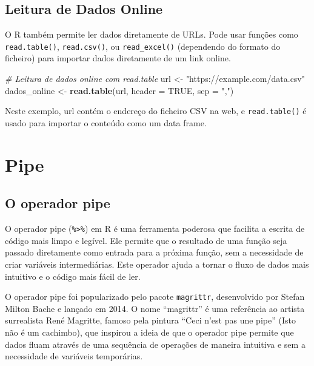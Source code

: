 \documentclass[
]{book}
\newenvironment{Shaded}{\begin{snugshade}}{\end{snugshade}}
\newcommand{\AttributeTok}[1]{\textcolor[rgb]{0.13,0.29,0.53}{#1}}
\newcommand{\CommentTok}[1]{\textcolor[rgb]{0.56,0.35,0.01}{\textit{#1}}}
\newcommand{\ConstantTok}[1]{\textcolor[rgb]{0.56,0.35,0.01}{#1}}
\newcommand{\FunctionTok}[1]{\textcolor[rgb]{0.13,0.29,0.53}{\textbf{#1}}}
\newcommand{\NormalTok}[1]{#1}
\newcommand{\OtherTok}[1]{\textcolor[rgb]{0.56,0.35,0.01}{#1}}
\newcommand{\StringTok}[1]{\textcolor[rgb]{0.31,0.60,0.02}{#1}}
\begin{document}
\section{Leitura de Dados Online}\label{leitura-de-dados-online}

O R também permite ler dados diretamente de URLs. Pode usar funções como
\texttt{read.table()}, \texttt{read.csv()}, ou \texttt{read\_excel()} (dependendo do formato
do ficheiro) para importar dados diretamente de um link online.

\begin{Shaded}
\begin{Highlighting}[]
\CommentTok{\# Leitura de dados online com read.table}
\NormalTok{url }\OtherTok{\textless{}{-}} \StringTok{"https://example.com/data.csv"}
\NormalTok{dados\_online }\OtherTok{\textless{}{-}} \FunctionTok{read.table}\NormalTok{(url, }\AttributeTok{header =} \ConstantTok{TRUE}\NormalTok{, }\AttributeTok{sep =} \StringTok{","}\NormalTok{)}
\end{Highlighting}
\end{Shaded}

Neste exemplo, url contém o endereço do ficheiro CSV na web, e
\texttt{read.table()} é usado para importar o conteúdo como um data frame.

\chapter{Pipe}\label{pipe}

\section{O operador pipe}\label{o-operador-pipe}

O operador pipe (\texttt{\%\textgreater{}\%}) em R é uma ferramenta poderosa que facilita a
escrita de código mais limpo e legível. Ele permite que o resultado de
uma função seja passado diretamente como entrada para a próxima função,
sem a necessidade de criar variáveis intermediárias. Este operador ajuda
a tornar o fluxo de dados mais intuitivo e o código mais fácil de ler.

O operador pipe foi popularizado pelo pacote \texttt{magrittr}, desenvolvido
por Stefan Milton Bache e lançado em 2014. O nome ``magrittr'' é uma
referência ao artista surrealista René Magritte, famoso pela pintura
``Ceci n'est pas une pipe'' (Isto não é um cachimbo), que inspirou a ideia
de que o operador pipe permite que dados fluam através de uma sequência
de operações de maneira intuitiva e sem a necessidade de variáveis
temporárias.
\end{document}
